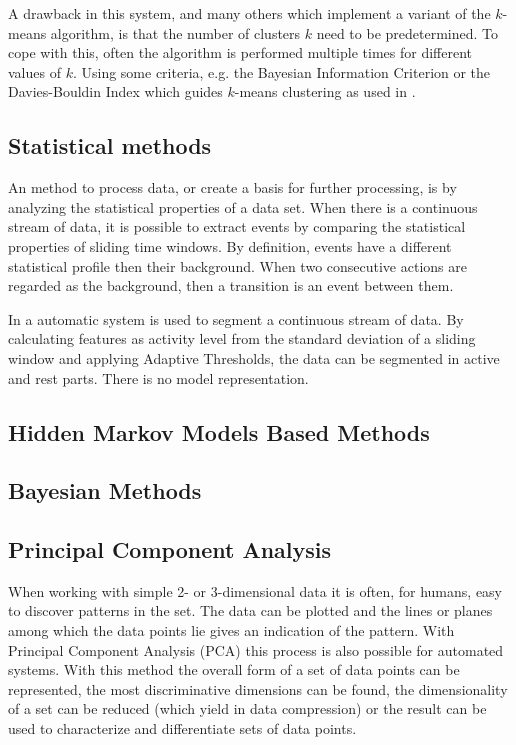 A drawback in this system, and many others which implement a variant of the $k$-means algorithm, is that the number of clusters $k$ need to be predetermined.
To cope with this, often the algorithm is performed multiple times for different values of $k$.
Using some criteria, e.g. the Bayesian Information Criterion \cite{pelleg2000x} or the Davies-Bouldin Index which guides $k$-means clustering as used in \cite{krause2003unsupervised}.

\subsection{Statistical methods}
An method to process data, or create a basis for further processing, is by analyzing the statistical properties of a data set.
When there is a continuous stream of data, it is possible to extract events by comparing the statistical properties of sliding time windows.
By definition, events have a different statistical profile then their background.
When two consecutive actions are regarded as the background, then a transition is an event between them.

In \cite{guenterberg2009automatic} a automatic system is used to segment a continuous stream of data.
By calculating features as activity level from the standard deviation of a sliding window and applying Adaptive Thresholds, the data can be segmented in active and rest parts.
There is no model representation.

\subsection{Hidden Markov Models Based Methods}

\subsection{Bayesian Methods}

\subsection{Principal Component Analysis}
When working with simple 2- or 3-dimensional data it is often, for humans, easy to discover patterns in the set.
The data can be plotted and the lines or planes among which the data points lie gives an indication of the pattern.
With Principal Component Analysis (PCA) this process is also possible for automated systems.
With this method the overall form of a set of data points can be represented, the most discriminative dimensions can be found, the dimensionality of a set can be reduced (which yield in data compression) or the result can be used to characterize and differentiate sets of data points.

